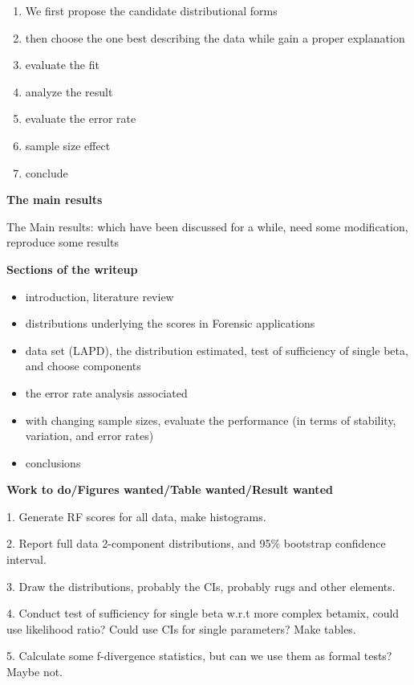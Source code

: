\documentclass[12pt]{article}         %
\begin{document}
\begin{enumerate}
\item We first propose the candidate distributional forms
\item then choose the one best describing the data while gain a proper explanation
\item evaluate the fit
\item analyze the result
\item evaluate the error rate
\item sample size effect
\item conclude
\end{enumerate}

\textbf {The main results}

\bigskip

The Main results: which have been discussed for a while, need some modification, reproduce some results

\bigskip

\textbf {Sections of the writeup}

\begin{itemize}
  \item introduction, literature review
  \item distributions underlying the scores in Forensic applications
  \item data set (LAPD), the distribution estimated, test of sufficiency of single beta, and choose components
  \item the error rate analysis associated
  \item with changing sample sizes, evaluate the performance (in terms of stability, variation, and error rates)
  \item conclusions
\end{itemize}

\textbf {Work to do/Figures wanted/Table wanted/Result wanted}


1.	Generate RF scores for all data, make histograms.

2.	Report full data 2-component distributions, and 95\% bootstrap confidence interval.

3.	Draw the distributions, probably the CIs, probably rugs and other elements.

4.	Conduct test of sufficiency for single beta w.r.t more complex betamix, could use likelihood ratio? Could use CIs for single parameters? Make tables.

5.	Calculate some f-divergence statistics, but can we use them as formal tests? Maybe not.
\end{document}
